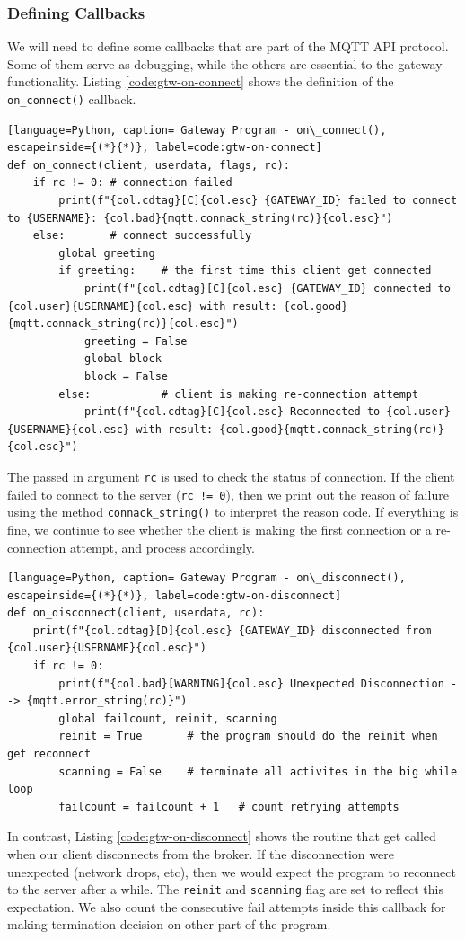 \subsubsection{Defining Callbacks}
We will need to define some callbacks that are part of the MQTT API protocol. Some of them serve as debugging, while the others are essential to the gateway functionality. Listing \ref{code:gtw-on-connect} shows the definition of the \texttt{on\_connect()} callback.
\begin{lstlisting}[language=Python, caption= Gateway Program - on\_connect(), escapeinside={(*}{*)}, label=code:gtw-on-connect]
def on_connect(client, userdata, flags, rc):
    if rc != 0: # connection failed
        print(f"{col.cdtag}[C]{col.esc} {GATEWAY_ID} failed to connect to {USERNAME}: {col.bad}{mqtt.connack_string(rc)}{col.esc}")
    else:       # connect successfully
        global greeting
        if greeting:    # the first time this client get connected
            print(f"{col.cdtag}[C]{col.esc} {GATEWAY_ID} connected to {col.user}{USERNAME}{col.esc} with result: {col.good}{mqtt.connack_string(rc)}{col.esc}")
            greeting = False
            global block
            block = False
        else:           # client is making re-connection attempt
            print(f"{col.cdtag}[C]{col.esc} Reconnected to {col.user}{USERNAME}{col.esc} with result: {col.good}{mqtt.connack_string(rc)}{col.esc}")
\end{lstlisting}
The passed in argument \texttt{rc} is used to check the status of connection. If the client failed to connect to the server (\texttt{rc != 0}), then we print out the reason of failure using the method \texttt{connack\_string()} to interpret the reason code. If everything is fine, we continue to see whether the client is making the first connection or a re-connection attempt, and process accordingly.

\begin{lstlisting}[language=Python, caption= Gateway Program - on\_disconnect(), escapeinside={(*}{*)}, label=code:gtw-on-disconnect]
def on_disconnect(client, userdata, rc):
    print(f"{col.cdtag}[D]{col.esc} {GATEWAY_ID} disconnected from {col.user}{USERNAME}{col.esc}")
    if rc != 0:
        print(f"{col.bad}[WARNING]{col.esc} Unexpected Disconnection --> {mqtt.error_string(rc)}")
        global failcount, reinit, scanning
        reinit = True       # the program should do the reinit when get reconnect
        scanning = False    # terminate all activites in the big while loop
        failcount = failcount + 1   # count retrying attempts
\end{lstlisting}
In contrast, Listing \ref{code:gtw-on-disconnect} shows the routine that get called when our client disconnects from the broker. If the disconnection were unexpected (network drops, etc), then we would expect the program to reconnect to the server after a while. The \texttt{reinit} and \texttt{scanning} flag are set to reflect this expectation. We also count the consecutive fail attempts inside this callback for making termination decision on other part of the program.

